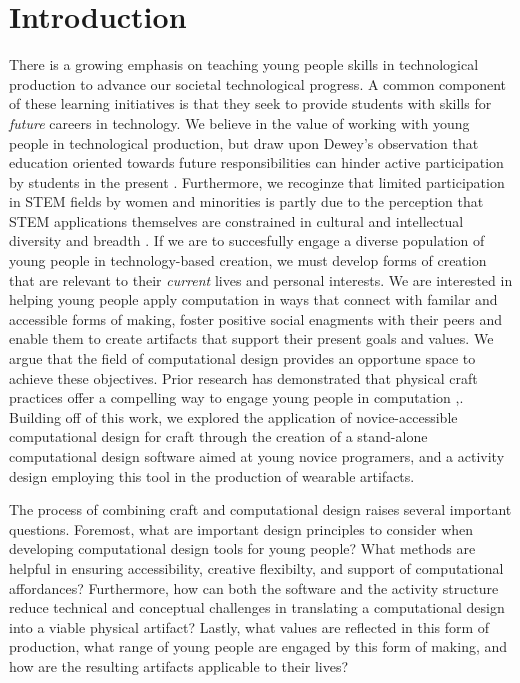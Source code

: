 \documentclass{sigchi}
\begin{document}
\section{Introduction}
There is a growing emphasis on teaching young people skills in technological production to advance our societal technological progress. A common component of these learning initiatives is that they seek to provide students with skills for \textit{future} careers in technology. We believe in the value of working with young people in technological production, but draw upon Dewey's observation that education oriented towards future responsibilities can hinder active participation by students in the present \cite{dewey}. Furthermore, we recoginze that limited participation in STEM fields by women and minorities is partly due to the perception that STEM applications themselves are constrained in cultural and intellectual diversity and breadth \cite{buechley_wild}. If we are to succesfully engage a diverse population of young people in technology-based creation, we must develop forms of creation that are relevant to their \emph{current} lives and personal interests. We are interested in helping young people apply computation in ways that connect with familar and accessible forms of making, foster positive social enagments with their peers and enable them to create artifacts that support their present goals and values. We argue that the field of computational design provides an opportune space to achieve these objectives. Prior research has demonstrated that physical craft practices offer a compelling way to engage young people in computation \cite{buechley_comptext},\cite{codeable_objects}. Building off of this work, we explored the application of novice-accessible computational design for craft through the creation of a stand-alone computational design software aimed at young novice programers, and a activity design employing this tool in the production of wearable artifacts.

The process of combining craft and computational design raises several important questions. Foremost, what are important design principles to consider when developing computational design tools for young people? What methods are helpful in ensuring accessibility, creative flexibilty, and support of computational affordances? Furthermore, how can both the software and the activity structure reduce technical and conceptual challenges in translating a computational design into a viable physical artifact? Lastly, what values are reflected in this form of production, what range of young people are engaged by this form of making, and how are the resulting artifacts applicable to their lives?
\end{document}
